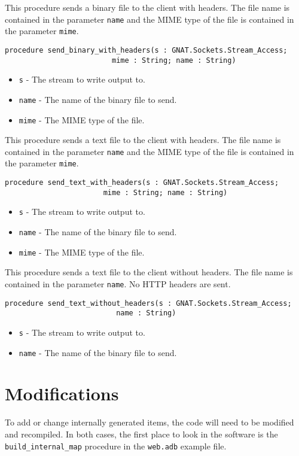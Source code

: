 \documentclass[10pt, openany]{book}
\newcommand{\function}[1]{\texttt{#1}}
\newcommand{\keyword}[1]{\texttt{#1}}
\newcommand{\filename}[1]{\texttt{#1}}
\begin{document}
This procedure sends a binary file to the client with headers.  The file name is contained in the parameter \keyword{name} and the MIME type of the file is contained in the parameter \keyword{mime}.
\begin{lstlisting}
procedure send_binary_with_headers(s : GNAT.Sockets.Stream_Access;
                         mime : String; name : String)
\end{lstlisting}
\begin{itemize}
  \item \keyword{s} - The stream to write output to.
  \item \keyword{name} - The name of the binary file to send.
  \item \keyword{mime} - The MIME type of the file.
\end{itemize}
This procedure sends a text file to the client with headers.  The file name is contained in the parameter \keyword{name} and the MIME type of the file is contained in the parameter \keyword{mime}.
\begin{lstlisting}
procedure send_text_with_headers(s : GNAT.Sockets.Stream_Access;
                       mime : String; name : String)
\end{lstlisting}
\begin{itemize}
  \item \keyword{s} - The stream to write output to.
  \item \keyword{name} - The name of the binary file to send.
  \item \keyword{mime} - The MIME type of the file.
\end{itemize}
This procedure sends a text file to the client without headers.  The file name is contained in the parameter \keyword{name}.  No HTTP headers are sent.
\begin{lstlisting}
procedure send_text_without_headers(s : GNAT.Sockets.Stream_Access;
                          name : String)
\end{lstlisting}
\begin{itemize}
  \item \keyword{s} - The stream to write output to.
  \item \keyword{name} - The name of the binary file to send.
\end{itemize}

\section{Modifications}
To add or change internally generated items, the code will need to be modified and recompiled.  In both cases, the first place to look in the software is the \function{build\_internal\_map} procedure in the \filename{web.adb} example file.
\end{document}
